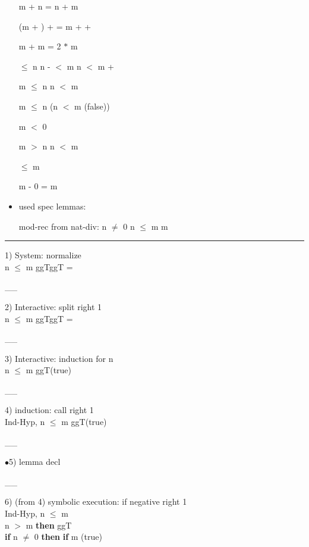 \documentclass[a4paper]{article}
\begin{document}
\begin{itemize}
 \Fol m + n = n + m

 \Fol (m + ) +  = m +  + 

 \Fol m + m = 2 $*$ m

 $\le$ n \Fol n -  $<$ m \Equiv n $<$ m + 

 \Fol \Not m $\le$ n \Equiv n $<$ m

 \Fol m $\le$ n \Imp (n $<$ m \Equiv (false))

 \Fol \Not m $<$ 0

 \Fol m $>$ n \Equiv n $<$ m

  $\le$ m

 \Fol m - 0 = m


\item used spec lemmas:

mod-rec from nat-div:  n $\neq$ 0 \Fol n $\le$ m \Imp m %

               \end{itemize}



\vspace{3ex}\rule{1\textwidth}{1mm}


1) System: normalize \\
 \Fol n $\le$ m \Imp \Do ggT\Dc \Do ggT\Dc {} = 

\vspace{-1.5ex}\_\hrulefill \_

2) Interactive: split right  1\\
n $\le$ m \Fol \Do ggT\Dc \Do ggT\Dc {} = 

\vspace{-1.5ex}\_\hrulefill \_

3) Interactive: induction  for n\\
n $\le$ m \Fol \Do ggT\Dc (true)

\vspace{-1.5ex}\_\hrulefill \_

4) induction: call right  1\\
Ind-Hyp, n $\le$ m \Fol \Do ggT\Dc (true)

\vspace{-1.5ex}\_\hrulefill \_

$\bullet$5) lemma decl \\
 \Fol 

\vspace{-1.5ex}\_\hrulefill \_

6)  (from 4) symbolic execution: if negative right  1\\
\tabf Ind-Hyp, n $\le$ m \\
\Fol {} n $>$ m {\bf then} ggT \\
 \tabf {} {\bf if} n $\neq$ 0 {\bf then} {\bf if} m %
(true)
\end{document}
